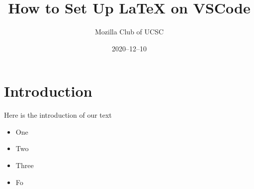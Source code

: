 \documentclass[12pt]{article}
\title{How to Set Up LaTeX on VSCode}
\author{Mozilla Club of UCSC}
\date{2020–12–10}
\begin{document}
\maketitle

\section{Introduction}

Here is the introduction of our text

\begin{itemize}

\item One

\item Two

\item Three

\item Fo

\end{itemize}
\end{document}
